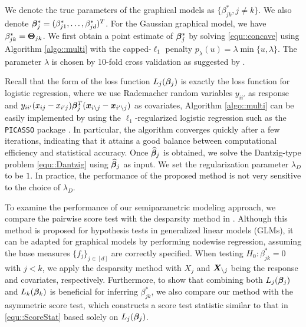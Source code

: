 \documentclass[twoside,11pt]{article}
\newcommand*{\hbbeta}{\hat{\bbeta}}
\newcommand*{\bbetas}{\bbeta^*}
\begin{document}

We denote the true parameters of the graphical models as $\{\beta_{jk}^*, j\neq k\}$. We also denote $\bm{\beta}^*_j=(\beta^*_{j1},\ldots, \beta^*_{jd})^T$. For the Gaussian graphical model, we have $\beta_{jk}^* = \bm{\Theta}_{jk}$.  We first obtain a point estimate of $\bbetas_j$  by solving \eqref{equ::concave} using Algorithm \ref{algo::multi}  with the capped-$\ell_1$ penalty $p_{\lambda}(u) = \lambda \min\{ u, \lambda\}.$ The  parameter $\lambda$ is chosen by 10-fold cross validation as suggested by \cite{ning2014sparc}. 

Recall that the form of the loss function $L_j(\bm{\beta}_j)$ is exactly the loss function for logistic regression, where we use Rademacher  random variables $y_{ii'}$ as response and $y_{ii'}(x_{ij} - x_{i'j}) \bm{\beta}_j^T (\bm{x}_{i\setminus j} - \bm{x}_{i'\setminus j})$ as covariates, Algorithm \ref{algo::multi}  can be easily implemented by using the $\ell_1$-regularized logistic regression such as  the \texttt{PICASSO} package \citep{gepicasso}. In particular, the algorithm converges quickly after a few iterations,  indicating that it attains a good balance  between computational efficiency and statistical accuracy. 
Once $\hbbeta_j$ is obtained, we solve the Dantzig-type problem \eqref{equ::Dantzig} using $\hbbeta_j$ as input. We set  the regularization parameter $\lambda_D$  to be $1$. In practice, the performance  of the proposed method   is not very sensitive to the choice of  $\lambda_D$. 
 
To examine the performance of  our  semiparametric modeling approach, we  compare the  pairwise score test  with  the desparsity method in \cite{van2013asymptotically}. Although this method is proposed for hypothesis tests in generalized linear models (GLMs), it can be adapted for graphical models by performing nodewise regression, assuming the base measures $\{ f_j \}_{j\in [d] }$ are correctly specified. 
When testing $H_0\colon \beta_{jk}^* = 0$ with $j< k$, 
we apply the desparsity method with  $X_j$ and $\bm{X}_{\setminus j}$ being the response and covariates, respectively.  
Furthermore, to show that combining both  $L_j(\bm{\beta}_j)$ and $L_k(\bm{\beta}_k)$ is beneficial for inferring $\beta_{jk} ^*$, we also compare our method with the asymmetric score test, which constructs a  score test statistic  similar to that in \eqref{equ::ScoreStat} based solely on   $L_j(\bm{\beta}_j)$. 
 
\end{document}
